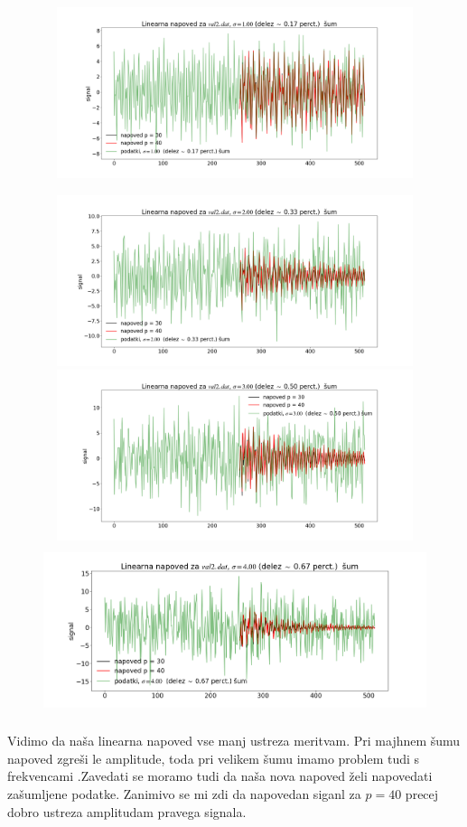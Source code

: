 \documentclass[11pt, a4paper]{article}
\begin{document}
\begin{figure}[H]
\centering

    \includegraphics[width=16cm,height=5cm]{zadnja1.png}
 
   \includegraphics[width=16cm,height=5cm]{zadnja2.png}
    \includegraphics[width=16cm,height=5cm]{zadnja3.png}
     \includegraphics[width=16cm,height=5cm]{zadnja4.png}
 

\end{figure}
Vidimo da naša linearna napoved vse manj ustreza meritvam. Pri majhnem šumu napoved zgreši le amplitude, toda pri velikem šumu imamo problem tudi s frekvencami .Zavedati se moramo tudi da naša nova napoved želi napovedati zašumljene  podatke. Zanimivo se mi zdi da napovedan siganl za $p=40$ precej dobro ustreza amplitudam pravega signala.   \newline
\end{document}
